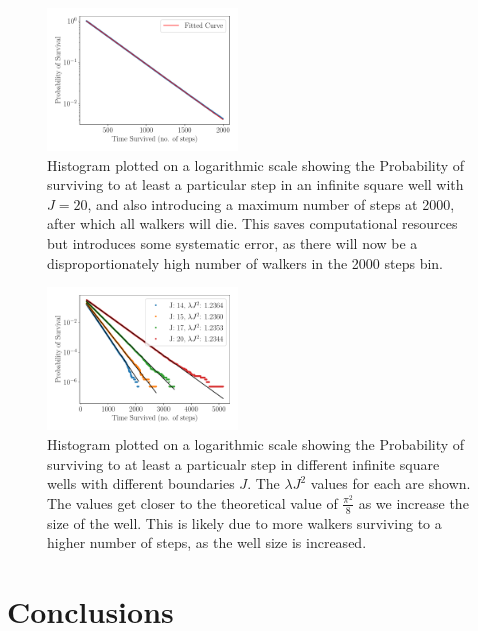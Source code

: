 \documentclass[journal]{IEEEtran}
\begin{document}
\begin{figure}%
  \begin{center}
    \includegraphics[width=0.45\textwidth]{images/cum_line_plot_cutoff.pdf}
    \caption{Histogram plotted on a logarithmic scale showing the Probability of
      surviving to at least a particular step in an infinite square well with $J
      = 20$, and also introducing a maximum number of steps at 2000, after which
      all walkers will die. This saves computational resources but introduces
      some systematic error, as there will now be a disproportionately high
      number of walkers in the 2000 steps bin.}
    \label{fig:cum_line_cutoff_plot}
  \end{center}
\end{figure}


\begin{figure}%
  \begin{center}
    \includegraphics[width=0.45\textwidth]{images/multiplot.pdf}
    \caption{Histogram plotted on a logarithmic scale showing the Probability of
      surviving to at least a particualr step in different infinite square wells with
      different boundaries $J$. The $\lambda J^2$ values for each are shown. The
      values get closer to the theoretical value of $\frac{\pi^2}{8}$ as we increase
      the size of the well. This is likely due to more walkers surviving to a higher
      number of steps, as the well size is increased.}
    \label{fig:multi_line_plot}
  \end{center}
\end{figure}


\section{Conclusions}
\end{document}
